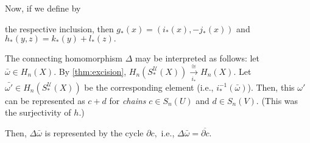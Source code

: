 \documentclass[12pt]{article}
\begin{document}
Now, if we define by

\begin{center}
\end{center}

the respective inclusion, then $g_*(x) = (i_*(x), -j_*(x))$ and $h_*(y, z) = k_*(y) + l_*(z).$

The connecting homomorphism $\Delta$ may be interpreted as follows: let $\bar{\omega} \in H_n(X).$ By \cref{thm:excision}, $H_n(S^{\mathcal{U}}_*(X)) \overset{\cong}{\underset{i_*}{\longrightarrow}} H_n(X).$ Let $\bar{\omega' }\in H_n(S^{\mathcal{U}}_*(X))$ be the corresponding element (i.e., $i_*^{-1}(\bar{\omega})$). Then, this $\omega'$ can be represented as $c + d$ for \emph{chains} $c \in S_n(U)$ and $d \in S_n(V).$ (This was the surjectivity of $h.$)

Then, $\Delta \bar{\omega}$ is represented by the cycle $\partial c,$ i.e., $\Delta \bar{\omega} = \overline{\partial c}.$
\end{document}
